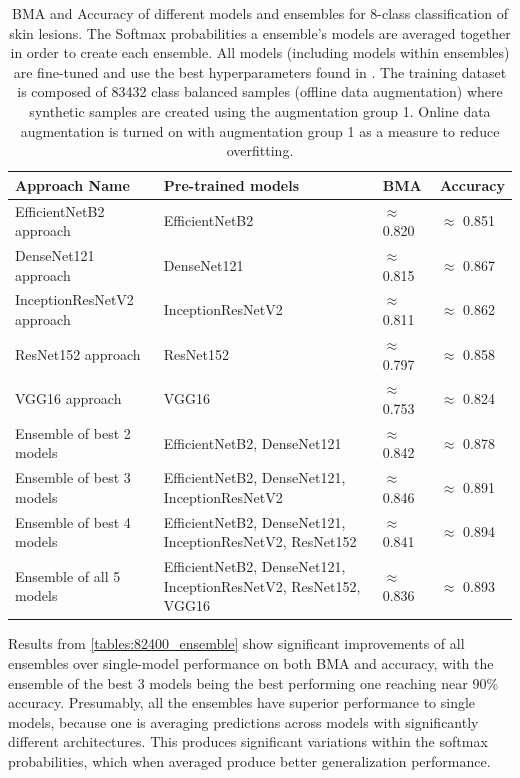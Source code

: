     \begin{table}[h]
        \centering
        \begin{tabularx}{\textwidth}{|l|X|X|X|}
            \hline
            Approach Name & Pre-trained models & \ac{BMA} & Accuracy \\ \hline
            EfficientNetB2 approach & EfficientNetB2 & $\approx$ 0.820 & $\approx$ 0.851 \\ \hline
            DenseNet121 approach & DenseNet121 & $\approx$ 0.815 & $\approx$ 0.867 \\ \hline
            InceptionResNetV2 approach & InceptionResNetV2 & $\approx$ 0.811 & $\approx$ 0.862 \\ \hline
            ResNet152 approach & ResNet152 & $\approx$ 0.797 & $\approx$ 0.858 \\ \hline
            VGG16 approach & VGG16 & $\approx$ 0.753 & $\approx$ 0.824 \\ \hline
            Ensemble of best 2 models & EfficientNetB2, DenseNet121 & $\approx$ 0.842 & $\approx$ 0.878 \\ \hline
            Ensemble of best 3 models & EfficientNetB2, DenseNet121, InceptionResNetV2 & $\approx$ 0.846 & $\approx$ 0.891 \\ \hline
            Ensemble of best 4 models & EfficientNetB2, DenseNet121, InceptionResNetV2, ResNet152 & $\approx$ 0.841 & $\approx$ 0.894 \\ \hline
            Ensemble of all 5 models & EfficientNetB2, DenseNet121, InceptionResNetV2, ResNet152, VGG16 & $\approx$ 0.836 & $\approx$ 0.893  \\ \hline
        \end{tabularx}
        \caption[\ac{BMA} and Accuracy of different models and ensembles for 8-class classification of skin lesions.]{\ac{BMA} and Accuracy of different models and ensembles for 8-class classification of skin lesions. The Softmax probabilities a ensemble's models are averaged together in order to create each ensemble. All models (including models within ensembles) are fine-tuned and use the best hyperparameters found in . The training dataset is composed of 83432 class balanced samples (offline data augmentation) where synthetic samples are created using the augmentation group 1. Online data augmentation is turned on with augmentation group 1 as a measure to reduce overfitting.}
        \label{tables:82400_ensemble}
    \end{table} 

    Results from \autoref{tables:82400_ensemble} show significant improvements of all ensembles over single-model performance on both \ac{BMA} and accuracy, with the ensemble of the best 3 models being the best performing one reaching near 90\% accuracy. Presumably, all the ensembles have superior performance to single models, because one is averaging predictions across models with significantly different architectures. This produces significant variations within the softmax probabilities, which when averaged produce better generalization performance. \par
    
